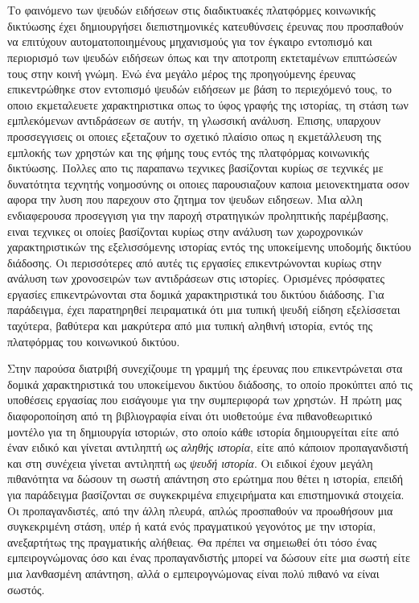 \chapter*{\cseextabstract}
\addstarredchapter{\cseextabstract} %
\makecseextabstract

Το φαινόμενο των ψευδών ειδήσεων στις διαδικτυακές πλατφόρμες κοινωνικής δικτύωσης έχει δημιουργήσει διεπιστημονικές κατευθύνσεις έρευνας που προσπαθούν να επιτύχουν αυτοματοποιημένους μηχανισμούς για τον έγκαιρο εντοπισμό και περιορισμό των ψευδών ειδήσεων όπως και την αποτροπη εκτεταμένων επιπτώσεών τους στην κοινή γνώμη. Ενώ ένα μεγάλο μέρος της προηγούμενης έρευνας επικεντρώθηκε στον εντοπισμό ψευδών ειδήσεων με βάση το περιεχόμενό τους, το οποιο εκμεταλευετε χαρακτηριστικα οπως το ύφος γραφής της ιστορίας, τη στάση των εμπλεκόμενων αντιδράσεων σε αυτήν, τη γλωσσική ανάλυση. Επισης, υπαρχουν προσσεγγισεις οι οποιες εξεταζουν το σχετικό πλαίσιο οπως η εκμετάλλευση της εμπλοκής των χρηστών και της φήμης τους εντός της πλατφόρμας κοινωνικής δικτύωσης. Πολλες απο τις παραπανω τεχνικες βασίζονται κυρίως σε τεχνικές με δυνατότητα τεχνητής νοημοσύνης οι οποιες παρουσιαζουν καποια μειονεκτηματα οσον αφορα την λυση που παρεχουν στο ζητημα τον ψευδων ειδησεων. Μια αλλη ενδιαφερουσα προσεγγιση για την παροχή στρατηγικών προληπτικής παρέμβασης, ειναι τεχνικες οι οποίες βασίζονται κυρίως στην ανάλυση των χωροχρονικών χαρακτηριστικών της εξελισσόμενης ιστορίας εντός της υποκείμενης υποδομής δικτύου διάδοσης. Οι περισσότερες από αυτές τις εργασίες επικεντρώνονται κυρίως στην ανάλυση των χρονοσειρών των αντιδράσεων στις ιστορίες. Ορισμένες πρόσφατες εργασίες επικεντρώνονται στα δομικά χαρακτηριστικά του δικτύου διάδοσης. Για παράδειγμα, έχει παρατηρηθεί πειραματικά ότι μια τυπική ψευδή είδηση εξελίσσεται ταχύτερα, βαθύτερα και μακρύτερα από μια τυπική αληθινή ιστορία, εντός της πλατφόρμας του κοινωνικού δικτύου.


Στην παρούσα διατριβή συνεχίζουμε τη γραμμή της έρευνας που επικεντρώνεται στα δομικά χαρακτηριστικά του υποκείμενου δικτύου διάδοσης, το οποίο προκύπτει από τις υποθέσεις εργασίας που εισάγουμε για την συμπεριφορά των χρηστών. Η πρώτη μας διαφοροποίηση από τη βιβλιογραφία είναι ότι υιοθετούμε ένα πιθανοθεωριτικό μοντέλο για τη δημιουργία ιστοριών, στο οποίο κάθε ιστορία δημιουργείται είτε από έναν ειδικό και γίνεται αντιληπτή ως \emph{αληθής ιστορία}, είτε από κάποιον προπαγανδιστή και στη συνέχεια γίνεται αντιληπτή ως \emph{ψευδή ιστορία}. Οι ειδικοί έχουν μεγάλη πιθανότητα να δώσουν τη σωστή απάντηση στο ερώτημα που θέτει η ιστορία, επειδή για παράδειγμα βασίζονται σε συγκεκριμένα επιχειρήματα και επιστημονικά στοιχεία. Οι προπαγανδιστές, από την άλλη πλευρά, απλώς προσπαθούν να προωθήσουν μια συγκεκριμένη στάση, υπέρ ή κατά ενός πραγματικού γεγονότος με την ιστορία, ανεξαρτήτως της πραγματικής αλήθειας. Θα πρέπει να σημειωθεί ότι τόσο ένας εμπειρογνώμονας όσο και ένας προπαγανδιστής μπορεί να δώσουν είτε μια σωστή είτε μια λανθασμένη απάντηση, αλλά ο εμπειρογνώμονας είναι πολύ πιθανό να είναι σωστός.


